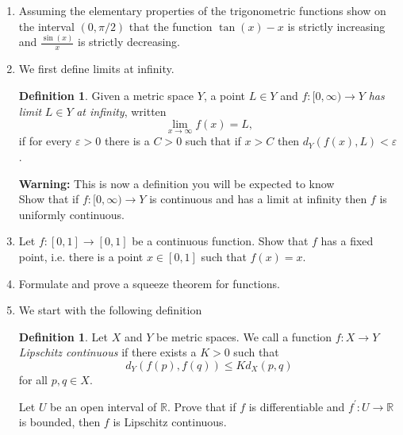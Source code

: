 \documentclass[12pt,letterpaper]{article}
\theoremstyle{plain}
\theoremstyle{definition}
\newtheorem{definition}[theorem]{Definition}
\begin{document}
\begin{enumerate}[1.]
\item Assuming the elementary properties of the trigonometric functions show on the interval $(0,\pi/2)$ that the function $\tan(x)-x$ is strictly increasing and $\frac{\sin(x)}{x}$ is strictly decreasing. 
\item We first define limits at infinity.  
\begin{definition}
Given a metric space $Y$, a point $L\in Y$ and $f:[0,\infty)\rightarrow Y$ \emph{has limit }$L\in Y$ \emph{at infinity}, written 
\[\lim_{x\rightarrow \infty}f(x)=L,\]
if for every $\varepsilon>0$ there is a $C>0$ such that if $x>C$ then $d_Y(f(x),L)<\varepsilon$. 
\end{definition}
{\bf Warning:} This is now a definition you will be expected to know\\

Show that if $f:[0,\infty)\rightarrow Y$ is continuous and has a limit at infinity then $f$ is uniformly continuous.  

\item Let $f:[0,1]\rightarrow [0,1]$ be a continuous function. Show that $f$ has a fixed point, i.e. there is a point $x\in [0,1]$ such that $f(x)=x$. 
\item Formulate and prove a squeeze theorem for functions. 
\item We start with the following definition
\begin{definition}Let $X$ and $Y$ be metric spaces.  We call a function $f:X\rightarrow Y $ \emph{Lipschitz continuous} if there exists a $K>0$ such that 
\[d_{Y}(f(p),f(q))\leq K d_X(p,q)\]
 for all $p,q\in X$. 
\end{definition}
 Let $U$ be an open interval of $\mathbb{R}$. Prove that if $f$ is differentiable and $f^\prime :U\rightarrow \mathbb{R}$ is bounded, then $f$ is Lipschitz continuous. 
\end{enumerate}
\end{document}
